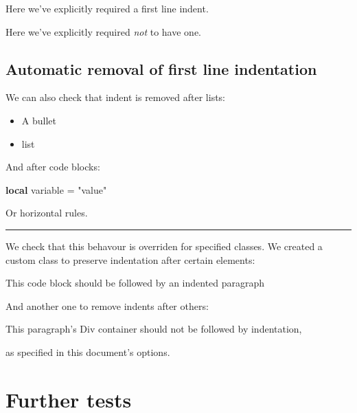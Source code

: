 \documentclass[
]{article}
\newenvironment{Shaded}{}{}
\newcommand{\KeywordTok}[1]{\textcolor[rgb]{0.00,0.44,0.13}{\textbf{#1}}}
\newcommand{\NormalTok}[1]{#1}
\newcommand{\OperatorTok}[1]{\textcolor[rgb]{0.40,0.40,0.40}{#1}}
\newcommand{\StringTok}[1]{\textcolor[rgb]{0.25,0.44,0.63}{#1}}
\newcommand{\VariableTok}[1]{\textcolor[rgb]{0.10,0.09,0.49}{#1}}
\providecommand{\tightlist}{%
  \setlength{\itemsep}{0pt}\setlength{\parskip}{0pt}}
\begin{document}
\noindent Here we've explicitly required a first line indent.

\noindent Here we've explicitly required \emph{not} to have one.

\hypertarget{automatic-removal-of-first-line-indentation}{%
\subsection{Automatic removal of first line
indentation}\label{automatic-removal-of-first-line-indentation}}

We can also check that indent is removed after lists:

\begin{itemize}
\tightlist
\item
  A bullet
\item
  list
\end{itemize}

\noindent And after code blocks:

\begin{Shaded}
\begin{Highlighting}[]
\KeywordTok{local} \VariableTok{variable} \OperatorTok{=} \StringTok{"value"}
\end{Highlighting}
\end{Shaded}

\noindent Or horizontal rules.

\begin{center}\rule{0.5\linewidth}{0.5pt}\end{center}

\noindent We check that this behavour is overriden for specified
classes. We created a custom class to preserve indentation after certain
elements:

\begin{Shaded}
\begin{Highlighting}[]
\NormalTok{This code block }
\NormalTok{should be followed }
\NormalTok{by an indented }
\NormalTok{paragraph}
\end{Highlighting}
\end{Shaded}

And another one to remove indents after others:

This paragraph's Div container should not be followed by indentation,

\noindent as specified in this document's options.

\hypertarget{further-tests}{%
\section{Further tests}\label{further-tests}}
\end{document}
